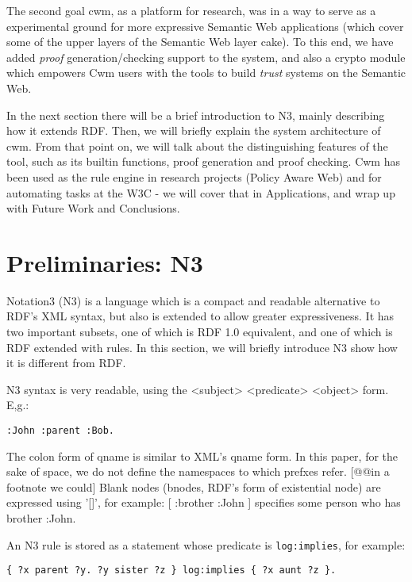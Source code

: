 \documentclass{tlp}
\begin{document}
\par The second goal cwm, as a platform for research, was in a way to
serve as a experimental ground for more expressive Semantic Web
applications (which cover some of the upper layers of the Semantic
Web layer cake). To this end, we have added {\it proof}
generation/checking support to the system, and also a crypto module
which empowers Cwm users with the tools to build {\it trust}
systems on the Semantic Web.

\par In the next section there will be a brief introduction to N3,
mainly describing how it extends RDF. Then, we will briefly explain
the system architecture of cwm. From that point on, we will talk
about the distinguishing features of the tool, such as its builtin
functions, proof generation and proof checking. Cwm has been used
as the rule engine in research projects (Policy Aware Web) and for
automating tasks at the W3C - we will cover that in Applications,
and wrap up with Future Work and Conclusions.




\section{Preliminaries: N3}
  

\par Notation3 (N3) is a language which is a compact and readable
alternative to RDF's XML syntax, but also is extended to allow
greater expressiveness. It has two important subsets, one of which
is RDF 1.0 equivalent, and one of which is RDF extended with rules.
In this section, we will briefly introduce N3 show how it is
different from RDF.

\par N3 syntax is very readable, using the <subject>
<predicate> <object> form. E,g.:

\par {\tt :John :parent :Bob.}

\par The colon form of qname is similar to XML's qname form. In this
paper, for the sake of space, we do not define the namespaces to
which prefxes refer. [@@in a footnote we could] Blank nodes
(bnodes, RDF's form of existential node) are expressed using '[]',
for example: [ :brother :John ] specifies some person who has
brother :John.

\par An N3 rule is stored as a statement whose predicate is
{\tt log:implies}, for example:
\begin{verbatim}
{ ?x parent ?y. ?y sister ?z } log:implies { ?x aunt ?z }.
\end{verbatim}
\end{document}
